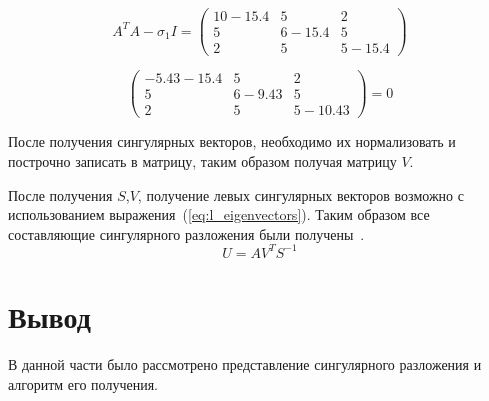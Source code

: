 \begin{equation}
	A^{T}A - \sigma_{1}I = \begin{pmatrix}
		10 - 15.4 & 5 & 2\\ 
		5 & 6 -15.4  &5\\
		2 & 5 & 5 - 15.4
	\end{pmatrix}
	\label{eq:r_eigenvectors_2}
\end{equation}

\begin{equation}
	\begin{pmatrix}
		-5.43 - 15.4 & 5 & 2\\ 
		5 & 6 -9.43  &5\\
		2 & 5 & 5 - 10.43
	\end{pmatrix} = 0
	\label{eq:r_eigenvectors_3}
\end{equation}

После получения сингулярных векторов, необходимо их нормализовать и построчно записать  в матрицу, таким образом получая матрицу $V$.

После получения $S$,$V$, получение левых сингулярных векторов возможно с использованием выражения~(\ref{eq:l_eigenvectors}).
Таким образом все составляющие сингулярного разложения были получены~\cite{SVD_algo}.
\begin{equation}
	U = AV^{T}S^{-1}
	\label{eq:l_eigenvectors}
\end{equation}















\section*{Вывод}
В данной части было рассмотрено представление сингулярного разложения и алгоритм его получения.
